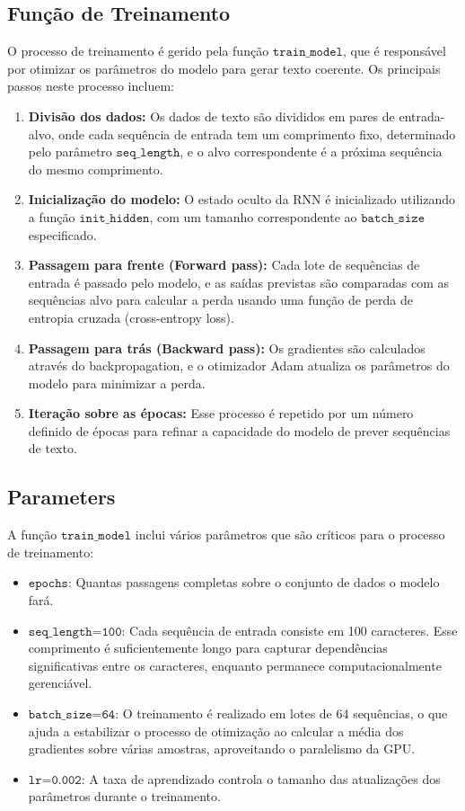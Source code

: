 \documentclass[a4paper,12pt]{article}
\begin{document}
\subsection{Função de Treinamento}
O processo de treinamento é gerido pela função $\texttt{train\_model}$, que é responsável por otimizar os parâmetros do modelo para gerar texto coerente. Os principais passos neste processo incluem:

\begin{enumerate}
    \item \textbf{Divisão dos dados:} Os dados de texto são divididos em pares de entrada-alvo, onde cada sequência de entrada tem um comprimento fixo, determinado pelo parâmetro $\texttt{seq\_length}$, e o alvo correspondente é a próxima sequência do mesmo comprimento.
    \item \textbf{Inicialização do modelo:} O estado oculto da RNN é inicializado utilizando a função $\texttt{init\_hidden}$, com um tamanho correspondente ao $\texttt{batch\_size}$ especificado.
    \item \textbf{Passagem para frente (Forward pass):} Cada lote de sequências de entrada é passado pelo modelo, e as saídas previstas são comparadas com as sequências alvo para calcular a perda usando uma função de perda de entropia cruzada (cross-entropy loss).
    \item \textbf{Passagem para trás (Backward pass):} Os gradientes são calculados através do backpropagation, e o otimizador Adam atualiza os parâmetros do modelo para minimizar a perda.
    \item \textbf{Iteração sobre as épocas:} Esse processo é repetido por um número definido de épocas para refinar a capacidade do modelo de prever sequências de texto.
    \end{enumerate}
\subsection{Parameters}

A função $\texttt{train\_model}$ inclui vários parâmetros que são críticos para o processo de treinamento:

\begin{itemize}
\item $\texttt{epochs}$: Quantas passagens completas sobre o conjunto de dados o modelo fará.
\item $\texttt{seq\_length=100}$: Cada sequência de entrada consiste em 100 caracteres. Esse comprimento é suficientemente longo para capturar dependências significativas entre os caracteres, enquanto permanece computacionalmente gerenciável.
\item $\texttt{batch\_size=64}$: O treinamento é realizado em lotes de 64 sequências, o que ajuda a estabilizar o processo de otimização ao calcular a média dos gradientes sobre várias amostras, aproveitando o paralelismo da GPU.
\item $\texttt{lr=0.002}$: A taxa de aprendizado controla o tamanho das atualizações dos parâmetros durante o treinamento.
\end{itemize}
\end{document}
